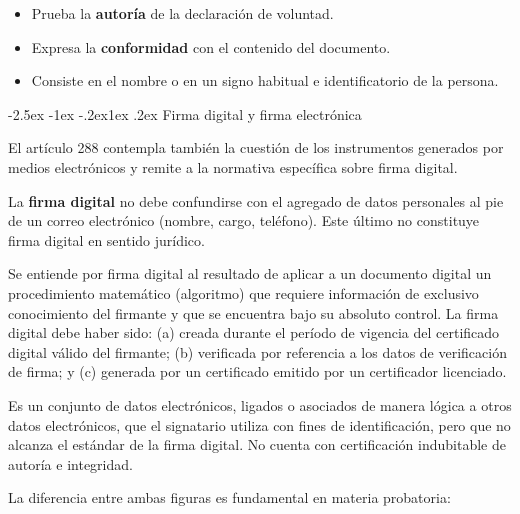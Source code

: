 \documentclass[12pt,oneside]{book}
\makeatletter
\renewcommand\subsection{\@startsection{subsection}{2}{\z@}%
  {-2.5ex \@plus -1ex \@minus -.2ex}{1ex \@plus .2ex}%
  {\normalfont\normalsize\bfseries}}
\makeatother
\begin{document}
\begin{itemize}
    \item Prueba la \textbf{autoría} de la declaración de voluntad.
    \item Expresa la \textbf{conformidad} con el contenido del documento.
    \item Consiste en el nombre o en un signo habitual e identificatorio de la persona.
\end{itemize}

\subsection{Firma digital y firma electrónica}

El artículo 288 contempla también la cuestión de los instrumentos generados por medios electrónicos y remite a la normativa específica sobre firma digital.

\begin{importante}
La \textbf{firma digital} no debe confundirse con el agregado de datos personales al pie de un correo electrónico (nombre, cargo, teléfono). Este último no constituye firma digital en sentido jurídico.
\end{importante}

\begin{definicion}
Se entiende por firma digital al resultado de aplicar a un documento digital un procedimiento matemático (algoritmo) que requiere información de exclusivo conocimiento del firmante y que se encuentra bajo su absoluto control. La firma digital debe haber sido: (a) creada durante el período de vigencia del certificado digital válido del firmante; (b) verificada por referencia a los datos de verificación de firma; y (c) generada por un certificado emitido por un certificador licenciado.
\end{definicion}

\begin{definicion}
Es un conjunto de datos electrónicos, ligados o asociados de manera lógica a otros datos electrónicos, que el signatario utiliza con fines de identificación, pero que no alcanza el estándar de la firma digital. No cuenta con certificación indubitable de autoría e integridad.
\end{definicion}

La diferencia entre ambas figuras es fundamental en materia probatoria:
\end{document}
